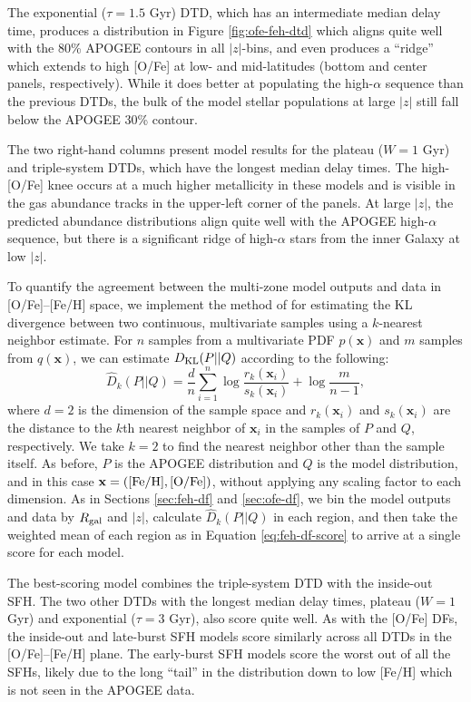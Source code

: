 \documentclass[twocolumn,twocolappendix]{aastex631}
\begin{document}
The exponential ($\tau=1.5$ Gyr) DTD, which has an intermediate median delay time, produces a distribution in Figure \ref{fig:ofe-feh-dtd} which aligns quite well with the 80\% APOGEE contours in all $|z|$-bins, and even produces a ``ridge'' which extends to high [O/Fe] at low- and mid-latitudes (bottom and center panels, respectively). While it does better at populating the high-$\alpha$ sequence than the previous DTDs, the bulk of the model stellar populations at large $|z|$ still fall below the APOGEE 30\% contour. 

The two right-hand columns present model results for the plateau ($W=1$ Gyr) and triple-system DTDs, which have the longest median delay times. The high-[O/Fe] knee occurs at a much higher metallicity in these models and is visible in the gas abundance tracks in the upper-left corner of the panels. At large $|z|$, the predicted abundance distributions align quite well with the APOGEE high-$\alpha$ sequence, but there is a significant ridge of high-$\alpha$ stars from the inner Galaxy at low $|z|$.

To quantify the agreement between the multi-zone model outputs and data in [O/Fe]--[Fe/H] space, we implement the method of \citet{PerezCruz2008-KLTest2D} for estimating the KL divergence between two continuous, multivariate samples using a $k$-nearest neighbor estimate. For $n$ samples from a multivariate PDF $p(\mathbf{x})$ and $m$ samples from $q(\mathbf{x})$, we can estimate $D_{\rm KL}(P||Q)$ according to the following:
\begin{equation}
    \label{eq:2d-kl-divergence}
    \hat D_k(P||Q) = \frac dn \sum_{i=1}^n\log\frac{r_k(\mathbf{x}_i)}{s_k(\mathbf{x}_i)} + \log\frac{m}{n-1},
\end{equation}
where $d=2$ is the dimension of the sample space and $r_k(\mathbf{x}_i)$ and $s_k(\mathbf{x}_i)$ are the distance to the $k$th nearest neighbor of $\mathbf{x}_i$ in the samples of $P$ and $Q$, respectively. We take $k=2$ to find the nearest neighbor other than the sample itself. As before, $P$ is the APOGEE distribution and $Q$ is the model distribution, and in this case $\mathbf{x}=({\rm [Fe/H]}, {\rm [O/Fe]})$, without applying any scaling factor to each dimension.
As in Sections \ref{sec:feh-df} and \ref{sec:ofe-df}, we bin the model outputs and data by $R_{\rm gal}$ and $|z|$, calculate $\hat D_k(P||Q)$ in each region, and then take the weighted mean of each region as in Equation \ref{eq:feh-df-score} to arrive at a single score for each model.

The best-scoring model combines the triple-system DTD with the inside-out SFH. The two other DTDs with the longest median delay times, plateau ($W=1$ Gyr) and exponential ($\tau=3$ Gyr), also score quite well. As with the [O/Fe] DFs, the inside-out and late-burst SFH models score similarly across all DTDs in the [O/Fe]--[Fe/H] plane. The early-burst SFH models score the worst out of all the SFHs, likely due to the long ``tail'' in the distribution down to low [Fe/H] which is not seen in the APOGEE data.
\end{document}
